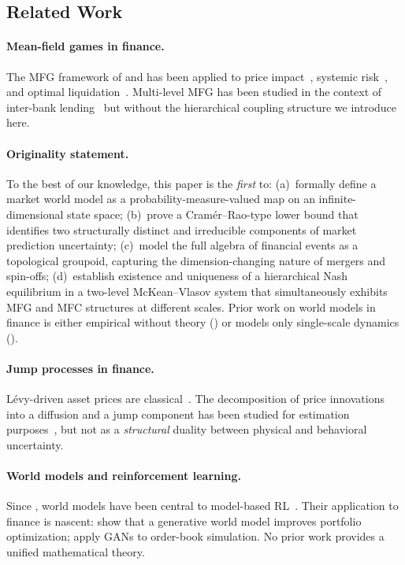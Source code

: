 \documentclass[12pt,a4paper]{article}
\theoremstyle{plain}
\theoremstyle{definition}
\newcommand{\1}{\mathbbm{1}}
\begin{document}
\subsection{Related Work}

\paragraph{Mean-field games in finance.}
The MFG framework of \citet{LasryLions2007} and \citet{HuangMalhame2006}
has been applied to price impact~\citep{CarmonaLacker2015},
systemic risk~\citep{CarmonaMouzouni2023}, and optimal
liquidation~\citep{CarmonaDelarue2018book}. Multi-level MFG has been studied
in the context of inter-bank lending~\citep{CarmonaSun2018} but without the
hierarchical coupling structure we introduce here.

\paragraph{Originality statement.}
To the best of our knowledge, this paper is the \emph{first} to:
(a)~formally define a market world model as a probability-measure-valued
map on an infinite-dimensional state space;
(b)~prove a Cramér--Rao-type lower bound that identifies two structurally
distinct and irreducible components of market prediction uncertainty;
(c)~model the full algebra of financial events as a topological groupoid,
capturing the dimension-changing nature of mergers and spin-offs;
(d)~establish existence and uniqueness of a hierarchical Nash equilibrium
in a two-level McKean--Vlasov system that simultaneously exhibits
MFG and MFC structures at different scales.
Prior work on world models in finance is either empirical without theory
(\citealt{AwmlgLiverpool2026}) or models only single-scale dynamics
(\citealt{CarmonaDelarue2018book}).

\paragraph{Jump processes in finance.}
Lévy-driven asset prices are classical~\citep{ContTankov2004,Kou2002}.
The decomposition of price innovations into a diffusion and a jump component
has been studied for estimation purposes~\citep{AitSahaliaTodorov2009}, but
not as a \emph{structural} duality between physical and behavioral uncertainty.

\paragraph{World models and reinforcement learning.}
Since \citet{HaSchmidhuber2018}, world models have been central to
model-based RL~\citep{Hafner2020Dreamer,Hafner2023DreamerV3}. Their application
to finance is nascent: \citet{AwmlgLiverpool2026} show that a generative world
model improves portfolio optimization; \citet{MorganJPMaGAN} apply GANs to
order-book simulation. No prior work provides a unified mathematical theory.
\end{document}
